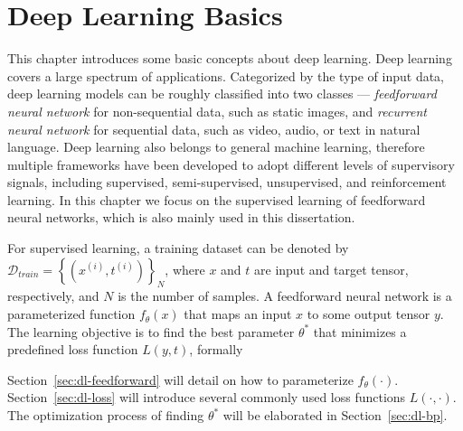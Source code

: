 \chapter{Deep Learning Basics}
\label{ch:deep-learning-basics}

This chapter introduces some basic concepts about deep learning. Deep learning covers a large spectrum of applications. Categorized by the type of input data, deep learning models can be roughly classified into two classes --- \emph{feedforward neural network} for non-sequential data, such as static images, and \emph{recurrent neural network} for sequential data, such as video, audio, or text in natural language. Deep learning also belongs to general machine learning, therefore multiple frameworks have been developed to adopt different levels of supervisory signals, including supervised, semi-supervised, unsupervised, and reinforcement learning. In this chapter we focus on the supervised learning of feedforward neural networks, which is also mainly used in this dissertation.

For supervised learning, a training dataset can be denoted by $\mathcal{D}_{train}=\left\{(x^{(i)}, t^{(i)})\right\}_N$, where $x$ and $t$ are input and target tensor, respectively, and $N$ is the number of samples. A feedforward neural network is a parameterized function $f_\theta(x)$ that maps an input $x$ to some output tensor $y$. The learning objective is to find the best parameter $\theta^*$ that minimizes a predefined loss function $L(y,t)$, formally
\begin{equation} \label{eq:objfunc}
\end{equation}

Section~\ref{sec:dl-feedforward} will detail on how to parameterize $f_\theta(\cdot)$. Section~\ref{sec:dl-loss} will introduce several commonly used loss functions $L(\cdot,\cdot)$. The optimization process of finding $\theta^*$ will be elaborated in Section~\ref{sec:dl-bp}.






